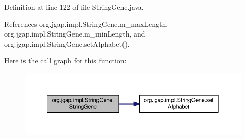 Definition at line 122 of file String\-Gene.\-java.



References org.\-jgap.\-impl.\-String\-Gene.\-m\-\_\-max\-Length, org.\-jgap.\-impl.\-String\-Gene.\-m\-\_\-min\-Length, and org.\-jgap.\-impl.\-String\-Gene.\-set\-Alphabet().



Here is the call graph for this function\-:
\nopagebreak
\begin{figure}[H]
\begin{center}
\leavevmode
\includegraphics[width=350pt]{classorg_1_1jgap_1_1impl_1_1_string_gene_ace800f00686df81e25e62d4271667ff8_cgraph}
\end{center}
\end{figure}




